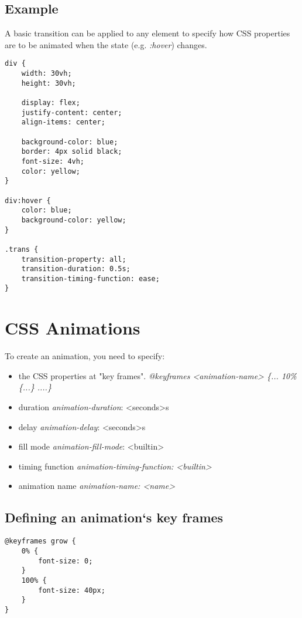 \documentclass[]{article}
\newcommand{\<}{\guilsinglleft}
\renewcommand{\>}{\guilsinglright}
\renewcommand{\it}[1]{\textit{#1}}
\begin{document}
\subsection{Example}
A basic transition can be applied to any element to specify how CSS properties are to be animated when the state (e.g. \it{:hover})  changes.
\begin{lstlisting}
div {
	width: 30vh;
	height: 30vh;
	
	display: flex;
	justify-content: center;
	align-items: center;
	
	background-color: blue;
	border: 4px solid black;
	font-size: 4vh;
	color: yellow;
}

div:hover {
	color: blue;
	background-color: yellow;
}

.trans {
	transition-property: all;
	transition-duration: 0.5s;
	transition-timing-function: ease;
}
\end{lstlisting}


\section{CSS Animations}
To create an animation, you need to specify:
\begin{itemize}
	\item  the CSS properties at "key frames".
	\subitem \it{@keyframes <animation-name> \{... 10\% \{...\} ....\}}
	
	\item duration
	\subitem \it{animation-duration}: <seconds>s
	
	\item delay 
	\subitem \it{animation-delay}: <seconds>s
	
	\item fill mode
	\subitem \it{animation-fill-mode}: <builtin>
	
	\item timing function
	\subitem \it{animation-timing-function: <builtin>}
	
	\item animation name
	\subitem \it{animation-name: <name>}
\end{itemize}

\subsection{Defining an animation`s key frames}
\begin{lstlisting}
@keyframes grow {
	0% { 
		font-size: 0; 
	}
	100% {
		font-size: 40px; 
	}
}
\end{lstlisting}
\end{document}
